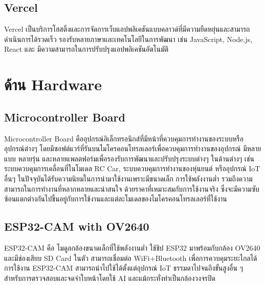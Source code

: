 \subsection{Vercel}
Vercel เป็นบริการโฮสติ้งและการจัดการเว็บแอปพลิเคชันแบบคลาวด์ที่มีความยืดหยุ่นและสามารถดำเนินการได้รวดเร็ว รองรับหลายภาษาและเทคโนโลยีในการพัฒนา เช่น JavaScript, Node.js, React และ มีความสามารถในการปรับปรุงแอปพลิเคชันอัตโนมัติ

\section{ด้าน Hardware}

\subsection{Microcontroller Board}
Microcontroller Board คืออุปกรณ์อิเล็กทรอนิกส์ที่มีหน้าที่ควบคุมการทำงานของระบบหรืออุปกรณ์ต่างๆ โดยมีซอฟต์แวร์ที่รันบนไมโครคอนโทรลเลอร์เพื่อควบคุมการทำงานของอุปกรณ์ มีหลายแบบ หลายรุ่น และหลายแพลตฟอร์มเพื่อรองรับการพัฒนาและปรับปรุงระบบต่างๆ ในด้านต่างๆ เช่น ระบบควบคุมการเคลื่อนที่ในโมเดล RC Car, 
ระบบควบคุมการทำงานของหุ่นยนต์ หรืออุปกรณ์ IoT อื่นๆ ในปัจจุบันได้รับความนิยมในการนำมาใช้งานเพราะมีขนาดเล็ก การใช้พลังงานต่ำ รวมถึงความสามารถในการทำงานที่หลากหลายและน่าสนใจ ด้วยราคาที่เหมาะสมกับการใช้งานจริง ซึ่งจะมีความซับซ้อนแตกต่างกันไปขึ้นอยู่กับการใช้งานและแต่ละโมเดลของไมโครคอนโทรลเลอร์ที่ใช้งาน\cite{Micro}

\subsection{ESP32-CAM with OV2640}
ESP32-CAM คือ โมดูลกล้องขนาดเล็กที่ใช้พลังงานต่ำ ใช้ชิป ESP32 มาพร้อมกับกล้อง OV2640 และมีช่องเสียบ SD Card ในตัว สามารถเชื่อมต่อ WiFi+Bluetooth เพื่อการควบคุมระยะไกลได้ 
การใช้งาน ESP32-CAM สามารถนำไปใช้ได้ตั้งแต่อุปกรณ์ IoT ธรรมดาไปจนถึงขั้นสูงอื่น ๆ สำหรับการตรวจสอบและจดจำใบหน้าโดยใช้ AI และแม้กระทั่งทำเป็นกล้องวงจรปิด





